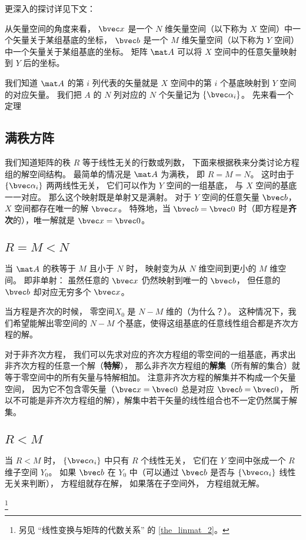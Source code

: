 更深入的探讨详见下文：

从矢量空间的角度来看， $\bvec x$ 是一个 $N$ 维矢量空间（以下称为 $X$ 空间）中一个矢量关于某组基底的坐标， $\bvec b$ 是一个 $M$ 维矢量空间（以下称为 $Y$ 空间）中一个矢量关于某组基底的坐标。 矩阵 $\mat A$ 可以将 $X$ 空间中的任意矢量映射到 $Y$ 后的坐标。

我们知道 $\mat A$ 的第 $i$ 列代表的矢量就是 $X$ 空间中的第 $i$ 个基底映射到 $Y$ 空间的对应矢量。 我们把 $A$ 的 $N$ 列对应的 $N$ 个矢量记为 $\{\bvec \alpha_i\}$。 先来看一个定理

\subsection{满秩方阵}
我们知道矩阵的秩 $R$ 等于线性无关的行数或列数， 下面来根据秩来分类讨论方程组的解空间结构。 最简单的情况是 $\mat A$ 为满秩， 即 $R = M = N$。 这时由于 $\{\bvec \alpha_i\}$ 两两线性无关， 它们可以作为 $Y$ 空间的一组基底， 与 $X$ 空间的基底一一对应。 那么这个映射既是单射又是满射。%
对于 $Y$ 空间的任意矢量 $\bvec b$， $X$ 空间都存在唯一的解 $\bvec x$。 特殊地，当 $\bvec b = \bvec 0$ 时（即方程是\textbf{齐次}的），唯一解就是 $\bvec x = \bvec 0$。

\subsection{$R = M < N$}\label{sub_LinEq_1}

当 $\mat A$ 的秩等于 $M$ 且小于 $N$ 时， 映射变为从 $N$ 维空间到更小的 $M$ 维空间。 即非单射： 虽然任意的 $\bvec x$ 仍然映射到唯一的 $\bvec b$， 但任意的 $\bvec b$ 却对应无穷多个 $\bvec x$。 


当方程是齐次的时候， 零空间$X_0$ 是 $N- M$ 维的（为什么？）。 这种情况下，我们希望能解出零空间的 $N - M$ 个基底，使得这组基底的任意线性组合都是齐次方程的解。

对于非齐次方程， 我们可以先求对应的齐次方程组的零空间的一组基底，再求出非齐次方程的任意一个解（\textbf{特解}）， 那么非齐次方程组的\textbf{解集}（所有解的集合）就等于零空间中的所有矢量与特解相加。 注意非齐次方程的解集并不构成一个矢量空间， 因为它不包含零矢量（$\bvec x = \bvec 0$ 总是对应 $\bvec b = \bvec 0$， 所以不可能是非齐次方程组的解），解集中若干矢量的线性组合也不一定仍然属于解集。

\subsection{$R < M$}
当 $R < M$ 时， $\{\bvec \alpha_i\}$ 中只有 $R$ 个线性无关， 它们在 $Y$ 空间中张成一个 $R$ 维子空间 $Y_0$。 如果 $\bvec b$ 在 $Y_0$ 中（可以通过 $\bvec b$ 是否与 $\{\bvec \alpha_i\}$ 线性无关来判断）， 方程组就存在解， 如果落在子空间外， 方程组就无解。

\footnote{另见 “线性变换与矩阵的代数关系” 的 \autoref{the_linmat_2}。}
